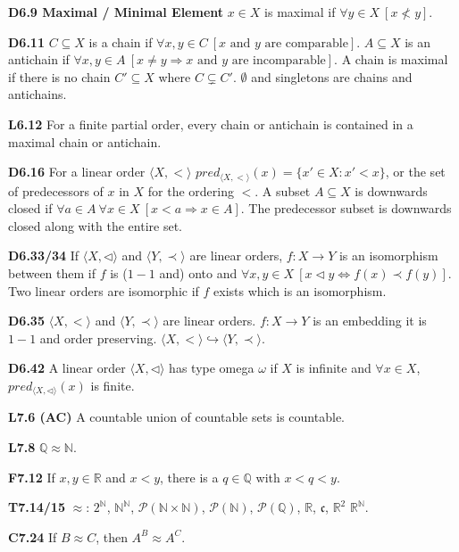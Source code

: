 \documentclass[10pt, landscape]{article}
\begin{document}
\begin{multicols*}{3}
\textbf{D6.9 Maximal / Minimal Element} $x \in X$ is maximal if $\forall y \in X \ [x \not < y]$.

\textbf{D6.11} $C \subseteq X$ is a chain if $\forall x, y \in C \ [x \text{ and } y \text{ are comparable}]$. $A \subseteq X$ is an antichain if $\forall x, y \in A \ [x \neq y \Rightarrow x \text{ and } y \text{ are incomparable}]$. A chain is maximal if there is no chain $C' \subseteq X$ where $C \subsetneq C'$. $\emptyset$ and singletons are chains and antichains.

\textbf{L6.12} For a finite partial order, every chain or antichain is contained in a maximal chain or antichain.
 
\textbf{D6.16} For a linear order $\langle X, < \rangle$ $pred_{\langle X, < \rangle}(x)=\{x' \in X : x' < x\}$, or the set of predecessors of $x$ in $X$ for the ordering $<$. A subset $A \subseteq X$ is downwards closed if $\forall a \in A \ \forall x \in X \ [x < a \Rightarrow x \in A]$. The predecessor subset is downwards closed along with the entire set.

\textbf{D6.33/34} If $\langle X, \lhd \rangle$ and $\langle Y, \prec \rangle$ are linear orders, $f: X \rightarrow Y$ is an isomorphism between them if $f$ is ($1-1$ and) onto and $\forall x, y \in X \ [x \lhd y \Leftrightarrow f(x) \prec f(y)]$. Two linear orders are isomorphic if $f$ exists which is an isomorphism.

\textbf{D6.35} $\langle X, < \rangle$ and $\langle Y, \prec \rangle$ are linear orders. $f:X\rightarrow Y$ is an embedding it is $1-1$ and order preserving.  $\langle X, <\rangle \hookrightarrow \langle Y, \prec \rangle$.

\textbf{D6.42} A linear order $\langle X, \lhd \rangle$ has type omega $\omega$ if $X$ is infinite and $\forall x \in X$, $pred_{\langle X, \lhd \rangle}(x)$ is finite.

\textbf{L7.6 (AC)} A countable union of countable sets is countable.

\textbf{L7.8} $\mathbb{Q} \approx \mathbb{N}$.

\textbf{F7.12} If $x, y \in \mathbb{R}$ and $x < y$, there is a $q \in \mathbb{Q}$ with $x < q < y$.

\textbf{T7.14/15} $\approx$: $2^\mathbb{N}$, $\mathbb{N}^\mathbb{N}$, $\mathcal{P}(\mathbb{N} \times \mathbb{N})$, $\mathcal{P}(\mathbb{N})$, $\mathcal{P}(\mathbb{Q})$, $\mathbb{R}$, $\mathfrak{c}$, $\mathbb{R}^2$ $\mathbb{R}^\mathbb{N}$.

\textbf{C7.24} If $B \approx C$, then $A^B \approx A^C$.


\end{multicols*}
\end{document}
